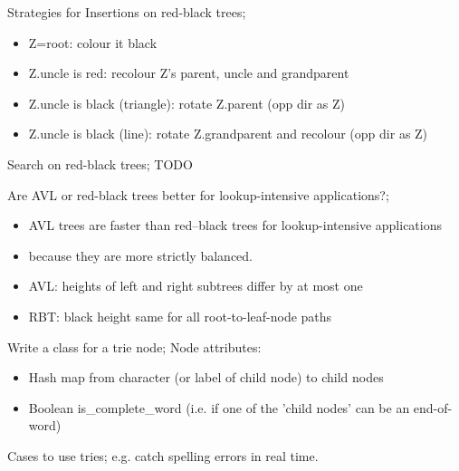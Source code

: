 \documentclass{article}
\begin{document}
Strategies for Insertions on red-black trees; \begin{itemize} \item Z=root: colour it black \item Z.uncle is red: recolour Z's parent, uncle and grandparent \item Z.uncle is black (triangle): rotate Z.parent (opp dir as Z) \item Z.uncle is black (line): rotate Z.grandparent and recolour (opp dir as Z) \end{itemize}

Search on red-black trees; TODO

Are AVL or red-black trees better for lookup-intensive applications?; \begin{itemize} \item AVL trees are faster than red–black trees for lookup-intensive applications \item because they are more strictly balanced.  \item AVL: heights of left and right subtrees differ by at most one \item RBT: black height same for all root-to-leaf-node paths \end{itemize}

Write a class for a trie node; Node attributes: \begin{itemize} \item Hash map from character (or label of child node) to child nodes \item Boolean is\_complete\_word (i.e. if one of the 'child nodes' can be an end-of-word) \end{itemize}

Cases to use tries; e.g. catch spelling errors in real time.
\end{document}
